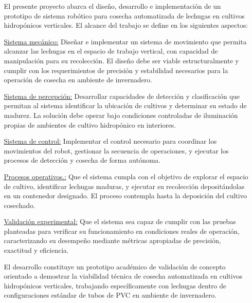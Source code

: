 El presente proyecto abarca el diseño, desarrollo e implementación de un prototipo de sistema robótico para cosecha automatizada de lechugas en cultivos hidropónicos verticales. El alcance del trabajo se define en los siguientes aspectos:

\underline{Sistema mecánico:} Diseñar e implementar un sistema de movimiento que permita alcanzar las lechugas en el espacio de trabajo vertical, con capacidad de manipulación para su recolección. El diseño debe ser viable estructuralmente y cumplir con los requerimientos de precisión y estabilidad necesarios para la operación de cosecha en ambiente de invernadero.

\underline{Sistema de percepción:} Desarrollar capacidades de detección y clasificación que permitan al sistema identificar la ubicación de cultivos y determinar su estado de madurez. La solución debe operar bajo condiciones controladas de iluminación propias de ambientes de cultivo hidropónico en interiores.

\underline{Sistema de control:} Implementar el control necesario para coordinar los movimientos del robot, gestionar la secuencia de operaciones, y ejecutar los procesos de detección y cosecha de forma autónoma.

\underline{Procesos operativos.:} Que el sistema cumpla con el objetivo de explorar el espacio de cultivo, identificar lechugas maduras, y ejecutar su recolección depositándolas en un contenedor designado. El proceso contempla hasta la deposición del cultivo cosechado.

\underline{Validación experimental:} Que el sistema sea capaz de cumplir con las pruebas planteadas para verificar su funcionamiento en condiciones reales de operación, caracterizando su desempeño mediante métricas apropiadas de precisión, exactitud y eficiencia.

El desarrollo constituye un prototipo académico de validación de concepto orientado a demostrar la viabilidad técnica de cosecha automatizada en cultivos hidropónicos verticales, trabajando específicamente con lechugas dentro de configuraciones estándar de tubos de PVC en ambiente de invernadero.
